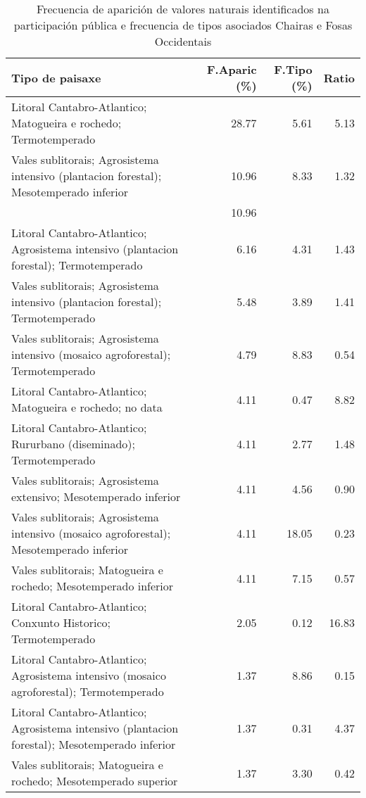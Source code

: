 \begin{table}[p]
\centering
\caption{Frecuencia de aparición de valores naturais identificados na participación pública e frecuencia de tipos asociados Chairas e Fosas Occidentais} 
\label{vsixotnat11}
\begin{tabular}{lrrr}
  \hline
Tipo de paisaxe & F.Aparic (\%) & F.Tipo (\%) & Ratio \\ 
  \hline
Litoral Cantabro-Atlantico; Matogueira e rochedo; Termotemperado & 28.77 & 5.61 & 5.13 \\ 
  Vales sublitorais; Agrosistema intensivo (plantacion forestal); Mesotemperado inferior & 10.96 & 8.33 & 1.32 \\ 
   & 10.96 &  &  \\ 
  Litoral Cantabro-Atlantico; Agrosistema intensivo (plantacion forestal); Termotemperado & 6.16 & 4.31 & 1.43 \\ 
  Vales sublitorais; Agrosistema intensivo (plantacion forestal); Termotemperado & 5.48 & 3.89 & 1.41 \\ 
  Vales sublitorais; Agrosistema intensivo (mosaico agroforestal); Termotemperado & 4.79 & 8.83 & 0.54 \\ 
  Litoral Cantabro-Atlantico; Matogueira e rochedo; no data & 4.11 & 0.47 & 8.82 \\ 
  Litoral Cantabro-Atlantico; Rururbano (diseminado); Termotemperado & 4.11 & 2.77 & 1.48 \\ 
  Vales sublitorais; Agrosistema extensivo; Mesotemperado inferior & 4.11 & 4.56 & 0.90 \\ 
  Vales sublitorais; Agrosistema intensivo (mosaico agroforestal); Mesotemperado inferior & 4.11 & 18.05 & 0.23 \\ 
  Vales sublitorais; Matogueira e rochedo; Mesotemperado inferior & 4.11 & 7.15 & 0.57 \\ 
  Litoral Cantabro-Atlantico; Conxunto Historico; Termotemperado & 2.05 & 0.12 & 16.83 \\ 
  Litoral Cantabro-Atlantico; Agrosistema intensivo (mosaico agroforestal); Termotemperado & 1.37 & 8.86 & 0.15 \\ 
  Litoral Cantabro-Atlantico; Agrosistema intensivo (plantacion forestal); Mesotemperado inferior & 1.37 & 0.31 & 4.37 \\ 
  Vales sublitorais; Matogueira e rochedo; Mesotemperado superior & 1.37 & 3.30 & 0.42 \\ 
   \hline
\end{tabular}
\end{table}
